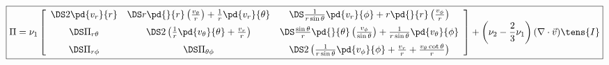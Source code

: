 \documentclass{article}
\begin{document}
\[    \boxed{
    \Pi = \nu_1\left[\begin{array}{ccc}
      \DS  2\pd{v_r}{r}
    & \DS   r\pd{}{r}\left(\frac{v_\theta}{r}\right) + \frac{1}{r}\pd{v_r}{\theta}
    & \DS   \frac{1}{r\sin\theta}\pd{v_r}{\phi} + r\pd{}{r}\left(\frac{v_\phi}{r}\right)
    \\ \noalign{\medskip}
      \DS  \Pi_{r\theta}
    & \DS  2\left(\frac{1}{r}\pd{v_\theta}{\theta} + \frac{v_r}{r}\right)
    & \DS   \frac{\sin\theta}{r}\pd{}{\theta}\left(\frac{v_\phi}{\sin\theta}\right)
          + \frac{1}{r\sin\theta}\pd{v_\theta}{\phi}
    \\ \noalign{\medskip}
      \DS \Pi_{r\phi}
    & \DS \Pi_{\theta\phi}
    & \DS 2\left(  \frac{1}{r\sin\theta}\pd{v_\phi}{\phi} + \frac{v_r}{r}
                 + \frac{v_\theta\cot\theta}{r}\right)
    \end{array}\right]
    + \left(\nu_2 - \frac{2}{3}\nu_1\right)(\nabla\cdot\vec{v}) \tens{I}
    }
\]
\pagebreak
\end{document}
